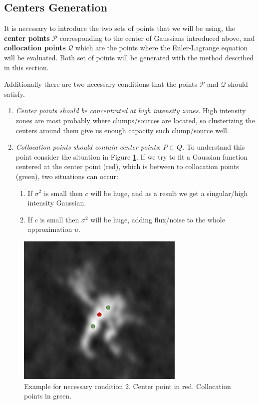 \documentclass{article}
\begin{document}
\subsection{Centers Generation} \label{centers}

It is necessary to introduce the two sets of points that we will be using, the \textbf{center points} $\mathcal{P}$ corresponding to the center of Gaussians introduced above, and \textbf{collocation points} $\mathcal{Q}$ which are the points where the Euler-Lagrange equation will be evaluated. Both set of points will be generated with the method described in this section.

Additionally there are two necessary conditions that the points $\mathcal{P}$ and $\mathcal{Q}$ should satisfy.
\begin{enumerate}
\item \textit{Center points should be concentrated at high intensity zones}. High intensity zones are most probably where clumps/sources are located, so clusterizing the centers around them give us enough capacity such clump/source well.
\item \textit{Collocation points should contain center points}: $P \subset Q$. To understand this point consider the situation in Figure \ref{fig:example}. If we try to fit a Gaussian function centered at the center point (red), which is between to collocation points (green), two situations can occur:
\begin{enumerate}
\item If $\sigma^2$ is small then $c$ will be huge, and as a result we get a singular/high intensity Gaussian.
\item If $c$ is small then $\sigma^2$ will be huge, adding flux/noise to the whole approximation $u$.
\end{enumerate}
\end{enumerate}

\begin{figure}[htpb!]
\centering
\includegraphics[width=8cm]{vc_img_00}
\caption{Example for necessary condition 2. Center point in red. Collocation points in green.}
\label{fig:example}
\end{figure}
\end{document}
